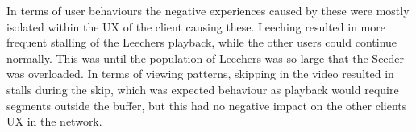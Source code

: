 In terms of user behaviours the negative experiences caused by these were mostly isolated within the \ac{UX} of the client causing these. Leeching resulted in more frequent stalling of the Leechers playback, while the other users could continue normally. This was until the population of Leechers was so large that the Seeder was overloaded. In terms of viewing patterns, skipping in the video resulted in stalls during the skip, which was expected behaviour as playback would require segments outside the buffer, but this had no negative impact on the other clients \ac{UX} in the network.



